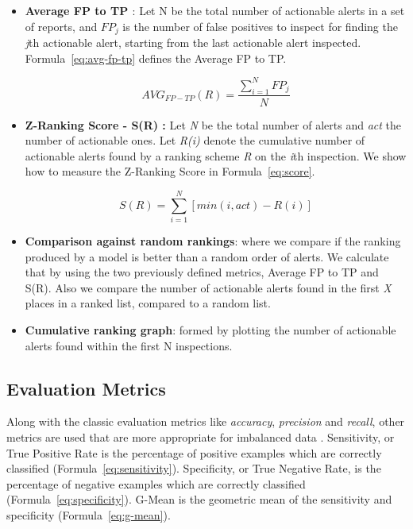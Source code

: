 \begin{itemize}
	\item \textbf{Average FP to TP \cite{correlation_exploitation}}: Let N be the total number of actionable alerts in a set of reports, and $FP_j$ is the number of false positives to inspect for finding the \textit{j}th actionable alert, starting from the last actionable alert inspected. Formula~\ref{eq:avg-fp-tp} defines the Average FP to TP.
	
	\begin{equation} \label{eq:avg-fp-tp}
		\mathit{AVG_{FP-TP}}(R) = \frac{\sum_{i=1}^{N} FP_j}{N}
	\end{equation}

	
	\item \textbf{Z-Ranking Score - S(R) \cite{z-ranking}:} 
Let \textit{N} be the total number of alerts and \textit{act} the number of actionable ones. Let \textit{R(i)} denote the cumulative number of actionable alerts found by a ranking scheme \textit{R} on the \textit{i}th inspection. We show how to measure the Z-Ranking Score in Formula~\ref{eq:score}.

	\begin{equation} \label{eq:score}
	S(R) = \sum_{i=1}^{N} [\mathit{min}(i,\mathit{act}) - R(i)]
	\end{equation}
	\item \textbf{Comparison against random rankings}: where we compare if the ranking produced by a model is better than a random order of alerts. We calculate that by using the two previously defined metrics, Average FP to TP and S(R).
	Also we compare the number of actionable alerts found in the first \textit{X} places in a ranked list, compared to a random list.
	\item \textbf{Cumulative ranking graph}: formed by plotting the number of actionable alerts found within the first N inspections.
\end{itemize}

\subsection{Evaluation Metrics}

Along with the classic evaluation metrics like \textit{accuracy}, \textit{precision} and \textit{recall}, other metrics are used that are more appropriate for imbalanced data \cite{comparison_metrics, iba_metric}. 
Sensitivity, or True Positive Rate is the percentage of positive examples which
are correctly classified (Formula~\ref{eq:sensitivity}).
Specificity, or True Negative Rate, is the percentage of negative examples which are correctly classified (Formula~\ref{eq:specificity}).
G-Mean is the geometric mean of the sensitivity and specificity (Formula~\ref{eq:g-mean}).


